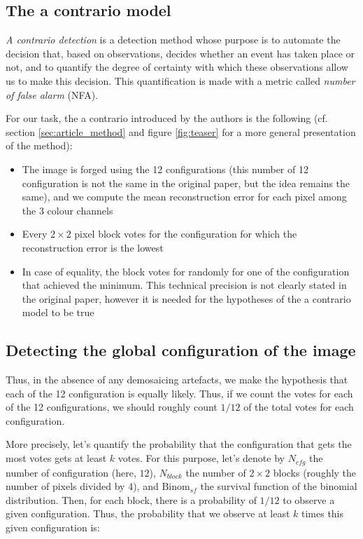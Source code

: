 \documentclass[sigconf, nonacm]{acmart}
\begin{document}
\subsection{The a contrario model}

\textit{A contrario detection} is a detection method whose purpose is to automate the decision that, based on observations, decides whether an event has taken place or not, and to quantify the degree of certainty with which these observations allow us to make this decision. This quantification is made with a metric called \textit{number of false alarm} (NFA).

For our task, the a contrario introduced by the authors is the following (cf. section \ref{sec:article_method} and figure \ref{fig:teaser} for a more general presentation of the method):

\begin{itemize}
    \item The image is forged using the 12 configurations (this number of 12 configuration is not the same in the original paper, but the idea remains the same), and we compute the mean reconstruction error for each pixel among the 3 colour channels
    \item Every $2 \times 2$ pixel block votes for the configuration for which the reconstruction error is the lowest
    \item In case of equality, the block votes for randomly for one of the configuration that achieved the minimum. This technical precision is not clearly stated in the original paper, however it is needed for the hypotheses of the a contrario model to be true
\end{itemize}

\subsection{Detecting the global configuration of the image} \label{sec:global_a_contrario}

Thus, in the absence of any demosaicing artefacts, we make the hypothesis that each of the 12 configuration is equally likely. Thus, if we count the votes for each of the 12 configurations, we should roughly count $1/12$ of the total votes for each configuration. 

More precisely, let's quantify the probability that the configuration that gets the most votes gets at least $k$ votes. For this purpose, let's denote by $N_{cfg}$ the number of configuration (here, $12$), $N_{block}$ the number of $2 \times 2$ blocks (roughly the number of pixels divided by 4), and $\text{Binom}_{sf}$ the survival function of the binomial distribution. Then, for each block, there is a probability of $1/12$ to observe a given configuration. Thus, the probability that we observe at least $k$ times this given configuration is:
\end{document}
